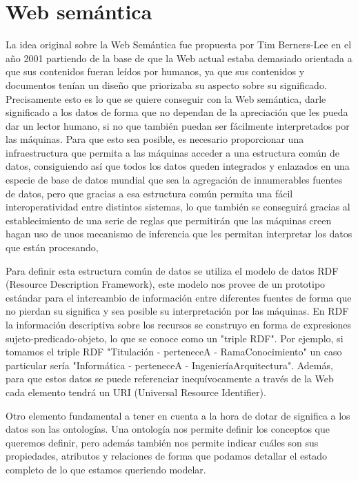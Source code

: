 \section{Web semántica}
La idea original sobre la Web Semántica fue propuesta por Tim Berners-Lee en el año 2001 partiendo de la base de que la Web actual estaba demasiado orientada a que sus contenidos fueran leídos por humanos, ya que sus contenidos y documentos tenían un diseño que priorizaba su aspecto sobre su significado. Precisamente esto es lo que se quiere conseguir con la Web semántica, darle significado a los datos de forma que no dependan de la apreciación que les pueda dar un lector humano, si no que también puedan ser fácilmente interpretados por las máquinas. Para que esto sea posible, es necesario proporcionar una infraestructura que permita a las máquinas acceder a una estructura común de datos, consiguiendo así que todos los datos queden integrados y enlazados en una especie de base de datos mundial que sea la agregación de innumerables fuentes de datos, pero que gracias a esa estructura común permita una fácil interoperatividad entre distintos sistemas, lo que también se conseguirá gracias al establecimiento de una serie de reglas que permitirán que las máquinas creen hagan uso de unos mecanismo de inferencia que les permitan interpretar los datos que están procesando, 

\bigskip
Para definir esta estructura común de datos se utiliza el modelo de datos RDF (Resource Description Framework), este modelo nos provee de un prototipo estándar para el intercambio de información entre diferentes fuentes de forma que no pierdan su significa y sea posible su interpretación por las máquinas. En RDF la información descriptiva sobre los recursos se construyo en forma de expresiones sujeto-predicado-objeto, lo que se conoce como un "triple RDF". Por ejemplo, si tomamos el triple RDF "Titulación - perteneceA - RamaConocimiento" un caso particular sería "Informática - perteneceA - IngenieríaArquitectura". Además, para que estos datos se puede referenciar inequívocamente a través de la Web cada elemento tendrá un URI (Universal Resource Identifier).

\bigskip

Otro elemento fundamental a tener en cuenta a la hora de dotar de significa a los datos son las ontologías. Una ontología nos permite definir los conceptos que queremos definir, pero además también nos permite indicar cuáles son sus propiedades, atributos y relaciones de forma que podamos detallar el estado completo de lo que estamos queriendo modelar.

